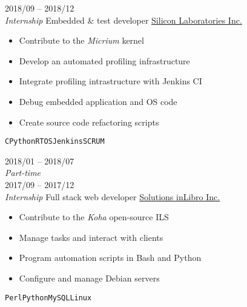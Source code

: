\documentclass[9pt]{developercv} %
\begin{document}
\begin{minipage}[t]{0.8\textwidth}

\begin{entrylist}
	\entry
		{2018/09 -- 2018/12\\{\small\emph{Internship}}}
		{Embedded \& test developer}
		{\href{https://www.silabs.com/}{Silicon Laboratories Inc.}}
		{
			\vspace{-14pt}
			\begin{itemize}
				\renewcommand{\labelitemi}{\raisebox{.45ex}{\rule{.6ex}{.6ex}}}
				\setlength\itemsep{-1pt}
				\item Contribute to the \emph{Micrium} kernel
				\item Develop an automated profiling infrastructure
				\item Integrate profiling intrastructure with Jenkins CI
				\item Debug embedded application and OS code
				\item Create source code refactoring scripts
			\end{itemize}
			\vspace{-4pt}
			\texttt{C}\slashsep\texttt{Python}\slashsep\texttt{RTOS}\slashsep\texttt{Jenkins}\slashsep\texttt{SCRUM}
		}
	\entry
		{2018/01 -- 2018/07\\{\small\emph{Part-time}}\\2017/09 -- 2017/12\\{\small\emph{Internship}}}
		{Full stack web developer}
		{\href{https://inlibro.com/en/}{Solutions inLibro Inc.}}
		{
			\vspace{-14pt}
			\begin{itemize}
				\renewcommand{\labelitemi}{\raisebox{.45ex}{\rule{.6ex}{.6ex}}}
				\setlength\itemsep{-1pt}
				\item Contribute to the \emph{Koha} open-source ILS
				\item Manage tasks and interact with clients
				\item Program automation scripts in Bash and Python
				\item Configure and manage Debian servers
			\end{itemize}
			\vspace{-4pt}
			\texttt{Perl}\slashsep\texttt{Python}\slashsep\texttt{MySQL}\slashsep\texttt{Linux}
		}
\end{entrylist}



\end{minipage}
\end{document}
